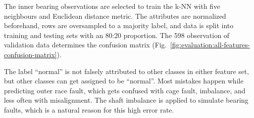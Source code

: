 The inner bearing observations are selected to train the k-NN with five neighbours and Euclidean distance metric. The attributes are normalized beforehand, rows are oversampled to a majority label, and data is split into training and testing sets with an 80:20 proportion. The 598 observation of validation data determines the confusion matrix (Fig.~\ref{fig:evaluation:all-features-confusion-matrix}). 

The label ``normal'' is not falsely attributed to other classes in either feature set, but other classes can get assigned to be ``normal''. Most mistakes happen while predicting outer race fault, which gets confused with cage fault, imbalance, and less often with misalignment. The shaft imbalance is applied to simulate bearing faults, which is a natural reason for this high error rate.

